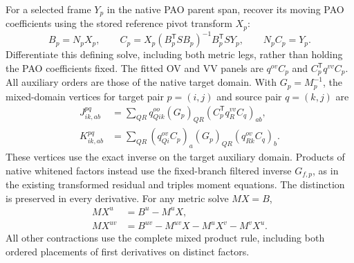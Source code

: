 \documentclass[11pt]{article}
\begin{document}
For a selected frame $Y_p$ in the native PAO parent span, recover its
moving PAO coefficients using the stored reference pivot transform $X_p$:
\begin{equation}
 B_p=N_pX_p,\qquad
 C_p=X_p(B_p^{\mathsf T}SB_p)^{-1}B_p^{\mathsf T}SY_p,
 \qquad N_pC_p=Y_p.
\end{equation}
Differentiate this defining solve, including both metric legs, rather than
holding the PAO coefficients fixed. The fitted OV and VV panels are
$q^{ov}C_p$ and $C_p^{\mathsf T}q^{vv}C_p$. All auxiliary orders are those
of the native target domain. With $G_p=M_p^{-1}$, the mixed-domain vertices
for target pair $p=(i,j)$ and source pair $q=(k,j)$ are
\begin{align}
 J^{pq}_{ik,ab}&=\sum_{QR}q^{oo}_{Qik}(G_p)_{QR}
                  (C_p^{\mathsf T}q^{vv}_RC_q)_{ab},\\
 K^{pq}_{ik,ab}&=\sum_{QR}(q^{ov}_{Qi}C_p)_a(G_p)_{QR}
                  (q^{ov}_{Rk}C_q)_b.
\end{align}
These vertices use the exact inverse on the target auxiliary domain.
Products of native whitened factors instead use the fixed-branch filtered
inverse $G_{f,p}$, as in the existing transformed residual and triples
moment equations. The distinction is preserved in every derivative.
For any metric solve $MX=B$,
\begin{align}
 MX^u&=B^u-M^uX,\\
 MX^{uv}&=B^{uv}-M^{uv}X-M^uX^v-M^vX^u.
\end{align}
All other contractions use the complete mixed product rule, including
both ordered placements of first derivatives on distinct factors.
\end{document}
